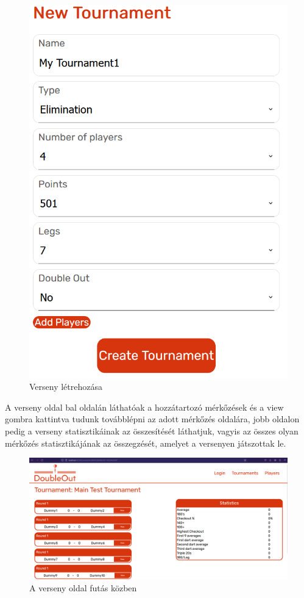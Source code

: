 \begin{figure}[h]
\centering
\includegraphics[scale=0.3]{images/NewTournamentTest.png}
\caption{Verseny létrehozása}
\label{fig:newTournamentTest}
\end{figure}

A verseny oldal bal oldalán láthatóak a hozzátartozó mérkőzések és a view gombra kattintva tudunk továbblépni az adott mérkőzés oldalára, jobb oldalon pedig a verseny statisztikáinak az összesítését láthatjuk, vagyis az összes olyan mérkőzés statisztikájának az összegzését, amelyet a versenyen játszottak le.

\begin{figure}[h]
\centering
\includegraphics[scale=0.3]{images/TournamentTest.png}
\caption{A verseny oldal futás közben}
\label{fig:tournamentTest}
\end{figure}

